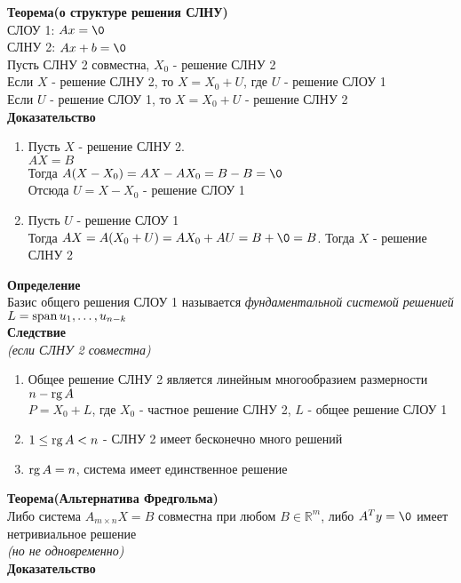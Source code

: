\documentclass[12pt]{article}
\begin{document}
\textbf{Теорема(о структуре решения СЛНУ)}\\
СЛОУ 1: $Ax=\0$\\
СЛНУ 2: $Ax+b = \0$\\
Пусть СЛНУ 2 совместна, $X_0$ - решение СЛНУ 2\\
Если $X$ - решение СЛНУ 2, то $X=X_0+U$, где $U$ - решение СЛОУ 1\\
Если $U$ - решение СЛОУ 1, то $X=X_0+U$ - решение СЛНУ 2\\
\textbf{Доказательство}
\begin{enumerate}
    \item Пусть $X$ - решение СЛНУ 2.\\
    $AX=B$\\
    Тогда $A(X-X_0)=AX-AX_0 = B-B=\0$\\
    Отсюда $U=X-X_0$ - решение СЛОУ 1
    \item Пусть $U$ - решение СЛОУ 1\\
    Тогда $AX = A(X_0+U) = AX_0+AU=B+\0=B$. Тогда $X$ - решение СЛНУ 2
\end{enumerate}
\textbf{Определение}\\
Базис общего решения СЛОУ 1 называется \textit{фундаментальной системой решенией}\\
$L=\operatorname{span} u_1, \ldots, u_{n-k}$\\
\textbf{Следствие}\\
\textit{(если СЛНУ 2 совместна)}
\begin{enumerate}
    \item Общее решение СЛНУ 2 является линейным многообразием размерности $n-\operatorname{rg} A$\\
    $P=X_0+L$, где $X_0$ - частное решение СЛНУ 2, $L$ - общее решение СЛОУ 1
    \item $1 \leq \operatorname{rg} A < n$ - СЛНУ 2 имеет бесконечно много решений
    \item $\operatorname{rg} A = n$, система имеет единственное решение
\end{enumerate}
\textbf{Теорема(Альтернатива Фредгольма)}\\
Либо система $A_{m \times n}X = B$ совместна при любом $B \in \mathbb{R}^m$, либо $A^T y = \0$ имеет нетривиальное решение\\
\textit{(но не одновременно)}\\
\textbf{Доказательство}
\end{document}

